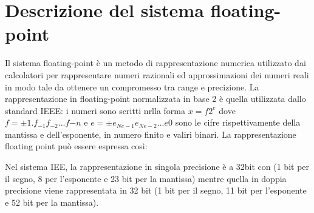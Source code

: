 \section{Descrizione del sistema floating-point}

Il sistema floating-point è 	un metodo di rappresentazione numerica utilizzato dai calcolatori per rappresentare numeri razionali ed approssimazioni dei numeri reali in modo tale da ottenere un compromesso tra range e precizione. La rappresentazione in floating-point normalizzata in base 2 è quella utilizzata dallo standard IEEE: i numeri sono scritti nrlla forma \(x={f2}^e \) dove \(f=\pm 1.f_{-1}f_{-2}...f{-n}  \) e \(e=\pm e_{Ne-1}e_{Ne-2}...e{0} \) sono le cifre rispettivamente della mantissa e dell'esponente, in numero finito e valiri binari. La rappresentazione floating point può essere espressa così:


Nel sistema IEE, la rappresentazione in singola precisione è a 32bit con (1 bit per il segno, 8 per l'esponente e 23 bit per la mantissa) mentre quella in doppia precisione viene rappresentata in 32 bit (1 bit per il segno, 11 bit per l'esponente e 52 bit per la mantissa).

